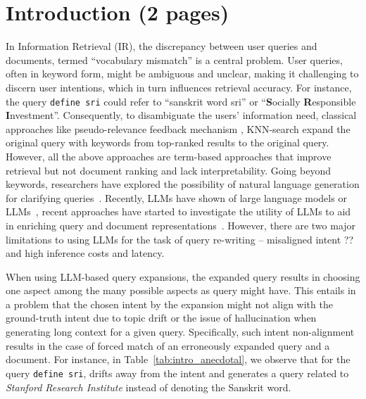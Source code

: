 \section{Introduction (2 pages)}
\label{sec:intro}



In Information Retrieval (IR), the discrepancy between user queries and documents, termed ``vocabulary mismatch'' is a central problem. 
User queries, often in keyword form, might be ambiguous and unclear, making it challenging to discern user intentions, which in turn influences retrieval accuracy. 
For instance, the query \texttt{define sri} could refer to ``sanskrit word sri'' or ``\textbf{S}ocially \textbf{R}esponsible \textbf{I}nvestment''.
Consequently, to disambiguate the users' information need, classical approaches like pseudo-relevance feedback mechanism \cite{lv2009comparative,ir_query_exp}, KNN-search \cite{grbovic2015context,zamani:2017:relevance-based-word-embedding,he2016learning} expand the original query with keywords from top-ranked results to the original query. 
However, all the above approaches are term-based approaches that improve retrieval but not document ranking and lack interpretability.  
Going beyond keywords, researchers have explored the possibility of natural language generation for clarifying queries~\cite{rao2018learning,zerveas2020brown,doc2query}.
Recently, LLMs have shown of large language models or LLMs~\cite{gpt3_prompting,gpt3incontext}, recent approaches have started to investigate the utility of LLMs to aid in enriching query and document representations~\cite{wang2023query2doc,gospodinov2023doc2query}. 
However, there are two major limitations to using LLMs for the task of query re-writing -- misaligned intent ?? and high inference costs and latency.


When using LLM-based query expansions, the expanded query results in choosing one aspect among the many possible aspects as query might have.
This entails in a problem that the chosen intent by the expansion might not align with the ground-truth intent due to topic drift or the issue of hallucination when generating long context for a given query.
Specifically, such intent non-alignment results in the case of forced match of an erroneously expanded query and a document. For instance, in Table~\ref{tab:intro_anecdotal}, we observe that for the query \texttt{define sri}, \qd{} drifts away from the intent and generates a query related to \textit{Stanford Research Institute }instead of denoting the Sanskrit word.  

